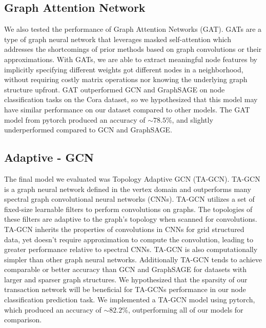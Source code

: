 \documentclass{article}
\begin{document}
\subsection{Graph Attention Network}
	We also tested the performance of Graph Attention Networks (GAT). GATs are a type of graph neural network that leverages masked self-attention which addresses the shortcomings of prior methods based on graph convolutions or their approximations. With GATs, we are able to extract meaningful node features by implicitly specifying different weights got different nodes in a neighborhood, without requiring costly matrix operations nor knowing the underlying graph structure upfront. GAT outperformed GCN and GraphSAGE on node classification tasks on the Cora dataset, so we hypothesized that this model may have similar performance on our dataset compared to other models. The GAT model from pytorch produced an accuracy of $\sim$$78.5\%$, and slightly underperformed compared to GCN and GraphSAGE.

\subsection{Adaptive - GCN}
	The final model we evaluated was Topology Adaptive GCN (TA-GCN). TA-GCN is a graph neural network defined in the vertex domain and outperforms many spectral graph convolutional neural networks (CNNs). TA-GCN utilizes a set of fixed-size learnable filters to perform convolutions on graphs. The topologies of these filters are adaptive to the graph’s topology when scanned for convolutions. TA-GCN inherits the properties of convolutions in CNNs for grid structured data, yet doesn’t require approximation to compute the convolution, leading to greater performance relative to spectral CNNs. TA-GCN is also computationally simpler than other graph neural networks. Additionally TA-GCN tends to achieve comparable or better accuracy than GCN and GraphSAGE for datasets with larger and sparser graph structures. We hypothesized that the sparsity of our transaction network will be beneficial for TA-GCNs performance in our node classification prediction task. We implemented a TA-GCN model using pytorch, which produced an accuracy of $\sim$$82.2\%$, outperforming all of our models for comparison.
\end{document}
